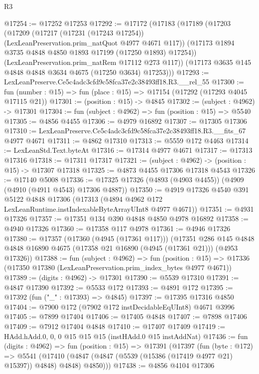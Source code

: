 \begin{lexlean}{R3}
\begin{coremodule}
@17254 := @17252 @17253
@17292 := @17172
    (@17183
      (@17189
        (@17203
          (@17209
            (@17217 (@17231 (@17243 @17254)) (LexLeanPreservation.prim_natQuot @4977 @4671 @117))
            (@17173 @1894 @3735 @4848 @4850 @1893 @17199 (@17250 @1893) @17254))
          (LexLeanPreservation.prim_natRem @17112 @273 @117))
        (@17173 @3635 @145 @4848 @4848 @3634 @4675 (@17250 @3634) @17253)))
@17293 := LexLeanPreserve.Ce5c4adc3cfd9c58fca37e2c38493ff18.R3.__rel_55
@17300 := fun (number : @15) => fun (place : @15) => @17154 (@17292 (@17293 @4045 @17115 @21))
@17301 := (position : @15) -> @4845
@17302 := (subject : @4962) -> @17301
@17304 := fun (subject : @4962) => fun (position : @15) => @5540
@17305 := @4856 @4455
@17306 := @4979 @16892
@17307 := @17305 @17306
@17310 := LexLeanPreserve.Ce5c4adc3cfd9c58fca37e2c38493ff18.R3.__fits_67 @4977 @4671
@17311 := @4862 @17310
@17313 := @5559 @172 @4463
@17314 := LexLeanStd.Text.byteAt
@17316 := @17314 @4977 @4671
@17317 := @17313 @17316
@17318 := @17311 @17317
@17321 := (subject : @4962) -> (position : @15) -> @17307 @17318
@17325 := @4873 @4455 @17306 @17318 @4543
@17326 := @17140 @5008
@17336 := @17325 @17326 (@4893 (@4903 @4455)) (@4909 (@4910 (@4911 @4543) @17306 @4887))
@17350 := @4919
    @17326
    @4540
    @391
    @5122
    @4848
    @17306
    (@17313 (@4894 @4962 @172 LexLeanRuntime.instIndexableByteArrayUInt8 @4977 @4671))
@17351 := @4931 @17326
@17357 := @17351 @134 @390 @4848 @4850 @4978 @16892
@17358 := @4940 @17326
@17360 := @17358 @117 @4978
@17361 := @4946 @17326
@17380 := @17357
    (@17360 (@4945 (@17361 @117)))
    (@17351
      @286
      @145
      @4848
      @4848
      @16890
      @4675
      (@17358 @21 @16890 (@4945 (@17361 @21)))
      (@4953 @17326))
@17388 := fun (subject : @4962) =>
  fun (position : @15) => @17336 (@17350 @17380 (LexLeanPreservation.prim_index_bytes @4977 @4671))
@17389 := (digits : @4962) -> @17301
@17390 := @5539 @17310
@17391 := @4847 @17390
@17392 := @5533 @172
@17393 := @4891 @172
@17395 := @17392 (fun ("_" : @17393) => @4845)
@17397 := @17395 @17316 @4850
@17404 := @7900 @172 (@7902 @172 instDecidableEqUInt8) @4671 @3996
@17405 := @7899 @17404
@17406 := @17405 @4848
@17407 := @7898 @17406
@17409 := @7912 @17404 @4848
@17410 := @17407 @17409
@17419 := HAdd.hAdd.{0, 0, 0} @15 @15 @15 (instHAdd.{0} @15 instAddNat)
@17436 := fun (digits : @4962) =>
  fun (position : @15) =>
  @17391
    (@17397
      (fun (byte : @172) =>
      @5541 (@17410 (@4847 (@4847 (@5539 (@15386 (@17419 @4977 @21) @15397)) @4848) @4848) @4850)))
@17438 := @4856 @4104 @17306

\end{coremodule}
\end{lexlean}
